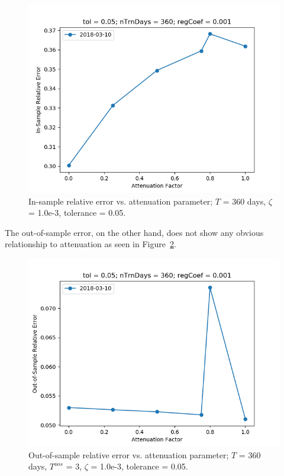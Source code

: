 \documentclass{article}
\begin{document}
\begin{figure}\label{fig:atnFct-sensitivity-error}
\includegraphics[bb=0 0 640 480]{figures/atnFct-sensitivity-error.png}
\caption{In-sample relative error vs. attenuation parameter; $T$ = 360
  days, $\zeta$ = 1.0e-3, tolerance = 0.05.}
\end{figure}

The out-of-sample error, on the other hand, does not show any obvious
relationship to attenuation as seen in
Figure~\ref{fig:atnFct-sensitivity-oos-error}.

\begin{figure}\label{fig:atnFct-sensitivity-oos-error}
\includegraphics[bb=0 0 640 480]{figures/atnFct-sensitivity-oos-error.png}
\caption{Out-of-sample relative error vs. attenuation parameter; $T$ =
  360 days, $T^{oos}$ = 3, $\zeta$ = 1.0e-3, tolerance = 0.05.}
\end{figure}
\end{document}
